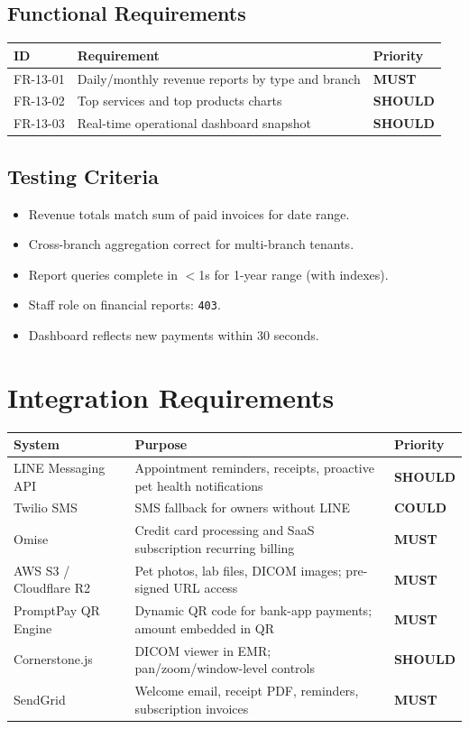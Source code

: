\documentclass[12pt,a4paper]{report}
\newcommand{\must}{\colorbox{red!15}{\color{errorred}\textbf{\small MUST}}}
\newcommand{\should}{\colorbox{orange!15}{\color{warnorange}\textbf{\small SHOULD}}}
\newcommand{\could}{\colorbox{green!10}{\color{successgreen}\textbf{\small COULD}}}
\newcommand{\testcheck}{\textcolor{successgreen}{\ding{51}}}
\begin{document}
\section{Functional Requirements}

\begin{longtable}{L{2.5cm} L{9cm} C{2cm}}
\toprule
\textbf{ID} & \textbf{Requirement} & \textbf{Priority} \\\midrule\endhead\bottomrule\endfoot
FR-13-01 & Daily/monthly revenue reports by type and branch & \must \\
FR-13-02 & Top services and top products charts & \should \\
FR-13-03 & Real-time operational dashboard snapshot & \should \\
\end{longtable}

\section{Testing Criteria}

\begin{itemize}
  \item[\testcheck] Revenue totals match sum of paid invoices for date range.
  \item[\testcheck] Cross-branch aggregation correct for multi-branch tenants.
  \item[\testcheck] Report queries complete in $<$1s for 1-year range (with indexes).
  \item[\testcheck] Staff role on financial reports: \texttt{403}.
  \item[\testcheck] Dashboard reflects new payments within 30 seconds.
\end{itemize}

\chapter{Integration Requirements}

\begin{longtable}{L{3.5cm} L{5.5cm} L{4.5cm}}
\toprule
\textbf{System} & \textbf{Purpose} & \textbf{Priority} \\\midrule\endhead\bottomrule\endfoot
LINE Messaging API   & Appointment reminders, receipts, proactive pet health notifications & \should \\
Twilio SMS           & SMS fallback for owners without LINE & \could \\
Omise                & Credit card processing and SaaS subscription recurring billing & \must \\
AWS S3 / Cloudflare R2 & Pet photos, lab files, DICOM images; pre-signed URL access & \must \\
PromptPay QR Engine  & Dynamic QR code for bank-app payments; amount embedded in QR & \must \\
Cornerstone.js       & DICOM viewer in EMR; pan/zoom/window-level controls & \should \\
SendGrid             & Welcome email, receipt PDF, reminders, subscription invoices & \must \\
\end{longtable}
\end{document}
